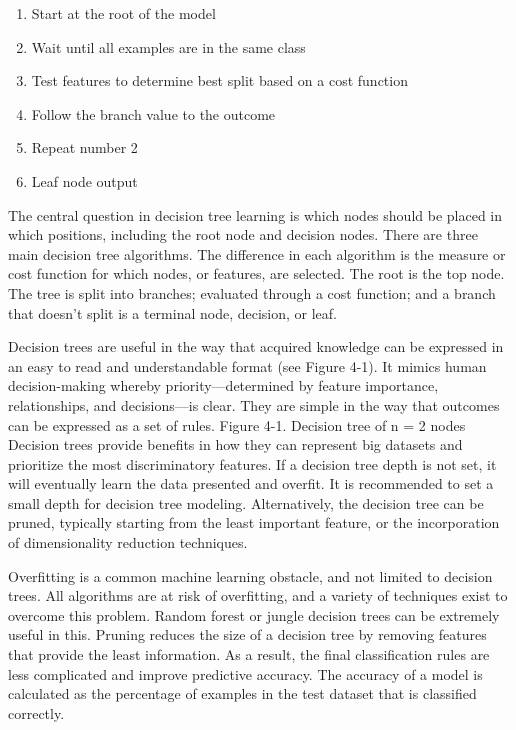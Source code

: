 \documentclass[12pt]{article}
\begin{document}
\begin{enumerate}
\item Start at the root of the model
\item Wait until all examples are in the same class
\item Test features to determine best split based on a cost function
\item Follow the branch value to the outcome
\item Repeat number 2
\item Leaf node output
\end{enumerate}

The central question in decision tree learning is which nodes should be placed in which positions, including the root node and decision nodes. There are three main decision tree algorithms. The difference in each algorithm is the measure or cost function for which nodes, or features, are selected. The root is the top node. The tree is split into branches; evaluated through a cost function; and a branch that doesn’t split is a terminal node, decision, or leaf.

Decision trees are useful in the way that acquired knowledge can be expressed in an easy to read and understandable format (see Figure 4-1). It mimics human decision-making whereby priority—determined by feature importance, relationships, and decisions—is clear. They are simple in the way that outcomes can be expressed as a set of rules. Figure 4-1. Decision tree of n = 2 nodes
Decision trees provide benefits in how they can represent big datasets and prioritize the most discriminatory features. If a decision tree depth is not set, it will eventually learn the data presented and overfit. It is recommended to set a small depth for decision tree modeling. Alternatively, the decision tree can be pruned, typically starting from the least important feature, or the incorporation of dimensionality reduction techniques.

Overfitting is a common machine learning obstacle, and not limited to decision trees. All algorithms are at risk of overfitting, and a variety of techniques exist to overcome this problem. Random forest or jungle decision trees can be extremely useful in this. Pruning reduces the size of a decision tree by removing features that provide the least information. As a result, the final classification rules are
less complicated and improve predictive accuracy. The accuracy of a model is calculated as the percentage of examples in
the test dataset that is classified correctly.
\end{document}
